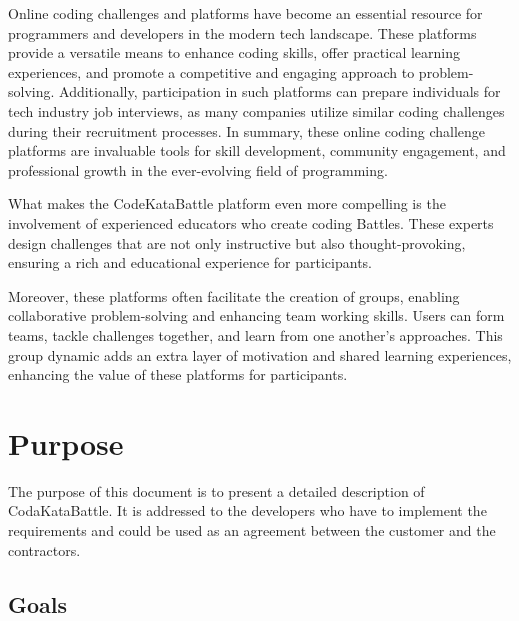 Online coding challenges and platforms have become an essential resource for programmers and developers in the modern tech landscape. These platforms provide a versatile means to enhance coding skills, offer practical learning experiences, and promote a competitive and engaging approach to problem-solving. Additionally, participation in such platforms can prepare individuals for tech industry job interviews, as many companies utilize similar coding challenges during their recruitment processes. 
In summary, these online coding challenge platforms are invaluable tools for skill development, community engagement, and professional growth in the ever-evolving field of programming.

What makes the CodeKataBattle platform even more compelling is the involvement of experienced educators who create coding Battles. These experts design challenges that are not only instructive but also thought-provoking, ensuring a rich and educational experience for participants.

Moreover, these platforms often facilitate the creation of groups, enabling collaborative problem-solving and enhancing team working skills. Users can form teams, tackle challenges together, and learn from one another's approaches. This group dynamic adds an extra layer of motivation and shared learning experiences, enhancing the value of these platforms for participants.

\newpage

\section{Purpose}
\label{sec:purpose}%
The purpose of this document is to present a detailed description of CodaKataBattle.
It is addressed to the developers who have to implement the requirements and could be used as an agreement between the customer and the contractors. 

\subsection{Goals}
\label{subsec:goals}%
\setcounter{g}{1}
\newcommand{\cg}{\theg\stepcounter{g}}


